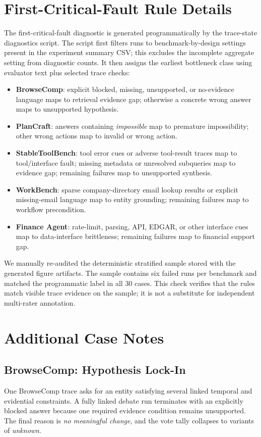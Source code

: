 \documentclass{article}
\theoremstyle{plain}
\theoremstyle{definition}
\theoremstyle{remark}
\begin{document}
\section{First-Critical-Fault Rule Details}
The first-critical-fault diagnostic is generated programmatically by the trace-state diagnostics script. The script first filters runs to benchmark-by-design settings present in the experiment summary CSV; this excludes the incomplete aggregate setting from diagnostic counts. It then assigns the earliest bottleneck class using evaluator text plus selected trace checks:
\begin{itemize}
    \item \textbf{BrowseComp}: explicit blocked, missing, unsupported, or no-evidence language maps to retrieval evidence gap; otherwise a concrete wrong answer maps to unsupported hypothesis.
    \item \textbf{PlanCraft}: answers containing \emph{impossible} map to premature impossibility; other wrong actions map to invalid or wrong action.
    \item \textbf{StableToolBench}: tool error cues or adverse tool-result traces map to tool/interface fault; missing metadata or unresolved subqueries map to evidence gap; remaining failures map to unsupported synthesis.
    \item \textbf{WorkBench}: sparse company-directory email lookup results or explicit missing-email language map to entity grounding; remaining failures map to workflow precondition.
    \item \textbf{Finance Agent}: rate-limit, parsing, API, EDGAR, or other interface cues map to data-interface brittleness; remaining failures map to financial support gap.
\end{itemize}
We manually re-audited the deterministic stratified sample stored with the generated figure artifacts. The sample contains six failed runs per benchmark and matched the programmatic label in all 30 cases. This check verifies that the rules match visible trace evidence on the sample; it is not a substitute for independent multi-rater annotation.

\section{Additional Case Notes}
\subsection{BrowseComp: Hypothesis Lock-In}
One BrowseComp trace asks for an entity satisfying several linked temporal and evidential constraints. A fully linked debate run terminates with an explicitly blocked answer because one required evidence condition remains unsupported. The final reason is \emph{no meaningful change}, and the vote tally collapses to variants of \emph{unknown}.
\end{document}
